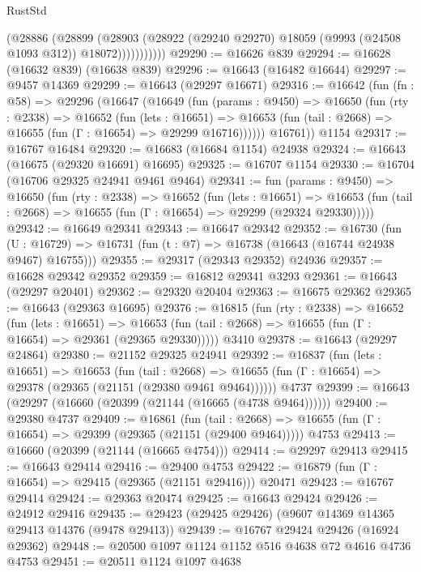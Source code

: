 \begin{lexlean}{RustStd}
\begin{coremodule}
                  (@28886
                    (@28899
                      (@28903
                        (@28922 (@29240 @29270) @18059 (@9993 (@24508 @1093 @312)) @18072)))))))))))
@29290 := @16626 @839
@29294 := @16628 (@16632 @839) (@16638 @839)
@29296 := @16643 (@16482 @16644)
@29297 := @9457 @14369
@29299 := @16643 (@29297 @16671)
@29316 := @16642
    (fun (fn : @58) =>
    @29296
      (@16647
        (@16649
          (fun (params : @9450) =>
          @16650
            (fun (rty : @2338) =>
            @16652
              (fun (lets : @16651) =>
              @16653 (fun (tail : @2668) => @16655 (fun (Γ : @16654) => @29299 @16716))))))
        @16761))
    @1154
@29317 := @16767 @16484
@29320 := @16683 (@16684 @1154) @24938
@29324 := @16643 (@16675 (@29320 @16691) @16695)
@29325 := @16707 @1154
@29330 := @16704 (@16706 @29325 @24941 @9461 @9464)
@29341 := fun (params : @9450) =>
  @16650
    (fun (rty : @2338) =>
    @16652
      (fun (lets : @16651) =>
      @16653 (fun (tail : @2668) => @16655 (fun (Γ : @16654) => @29299 (@29324 @29330)))))
@29342 := @16649 @29341
@29343 := @16647 @29342
@29352 := @16730
    (fun (U : @16729) => @16731 (fun (t : @7) => @16738 (@16643 (@16744 @24938 @9467) @16755)))
@29355 := @29317 (@29343 @29352) @24936
@29357 := @16628 @29342 @29352
@29359 := @16812 @29341 @3293
@29361 := @16643 (@29297 @20401)
@29362 := @29320 @20404
@29363 := @16675 @29362
@29365 := @16643 (@29363 @16695)
@29376 := @16815
    (fun (rty : @2338) =>
    @16652
      (fun (lets : @16651) =>
      @16653 (fun (tail : @2668) => @16655 (fun (Γ : @16654) => @29361 (@29365 @29330)))))
    @3410
@29378 := @16643 (@29297 @24864)
@29380 := @21152 @29325 @24941
@29392 := @16837
    (fun (lets : @16651) =>
    @16653
      (fun (tail : @2668) =>
      @16655 (fun (Γ : @16654) => @29378 (@29365 (@21151 (@29380 @9461 @9464))))))
    @4737
@29399 := @16643 (@29297 (@16660 (@20399 (@21144 (@16665 (@4738 @9464))))))
@29400 := @29380 @4737
@29409 := @16861
    (fun (tail : @2668) => @16655 (fun (Γ : @16654) => @29399 (@29365 (@21151 (@29400 @9464)))))
    @4753
@29413 := @16660 (@20399 (@21144 (@16665 @4754)))
@29414 := @29297 @29413
@29415 := @16643 @29414
@29416 := @29400 @4753
@29422 := @16879 (fun (Γ : @16654) => @29415 (@29365 (@21151 @29416))) @20471
@29423 := @16767 @29414
@29424 := @29363 @20474
@29425 := @16643 @29424
@29426 := @24912 @29416
@29435 := @29423 (@29425 @29426) (@9607 @14369 @14365 @29413 @14376 (@9478 @29413))
@29439 := @16767 @29424 @29426 (@16924 @29362)
@29448 := @20500 @1097 @1124 @1152 @516 @4638 @72 @4616 @4736 @4753
@29451 := @20511 @1124 @1097 @4638

\end{coremodule}
\end{lexlean}

